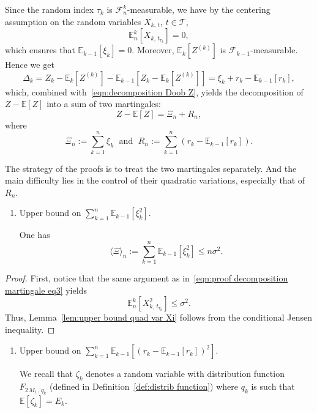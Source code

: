 \documentclass[AHL,Unicode,longabstracts,published]{cedram}
\newcommand{\bE}{\mathbb{E}}
\newcommand{\cF}{\mathcal{F}}
\newcommand{\cT}{\mathcal{T}}
\newcommand*{\romanenumi}{\renewcommand*{\theenumi}{\roman{enumi}}}
\begin{document}
Since the random index $\tau_k$ is $\cF_n^k$-measurable, we have by the centering assumption on the random variables $X_{k,\,t}$, $t\in\cT$,
\begin{equation}\label{eqn:proof decomposition martingale eq3}
\bE_n^k\left[X_{k,\,t_{\tau_k}}\right] =0,
\end{equation}
which ensures that $\bE_{k-1}[\xi_k]=0$. Moreover, $\bE_k[Z^{(k)}]$ is $\cF_{k-1}$-measurable. Hence we get
\[
\Delta_k =Z_k-\bE_k\left[Z^{(k)}\right]-\bE_{k-1}\left[Z_k-\bE_k\left[Z^{(k)}\right]\right]= \xi_k + r_k -\bE_{k-1}[r_k],
\]
which, combined with~\eqref{eqn:decomposition Doob Z}, yields the decomposition of $Z-\bE[Z]$ into a sum of two martingales:
\begin{equation}\label{eqn:decomposition Z-EZ}
Z-\bE[Z]=\Xi_n +R_n,
\end{equation}
where
\begin{equation}\label{eqn:decomposition Z-EZ-def martingales}
\Xi_n:=\sum_{k=1}^n \xi_k \; \text{ and }\;R_n:= \sum_{k=1}^n \left(r_k-\bE_{k-1}[r_k]\right).
\end{equation}


The strategy of the proofs is to treat the two martingales separately. And the main difficulty lies in the control of their quadratic variations, especially that of $R_n$.
\begin{enumerate}\romanenumi
\item Upper bound on $\sum_{k=1}^n \bE_{k-1}[\xi_k^2]$.
\begin{lemm}\label{lem:upper bound quad var Xi}
One has
\[
\langle \Xi \rangle_n:=\sum_{k=1}^n \bE_{k-1}\left[\xi_k^2\right]\leq n\sigma^2.
\]
\end{lemm}
\end{enumerate}

\begin{proof}
First, notice that the same argument as in~\eqref{eqn:proof decomposition martingale eq3} yields
\[
\bE_n^k[X_{k,\,t_{\tau_k}}^2]\leq \sigma^2.
\]
Thus, Lemma~\ref{lem:upper bound quad var Xi} follows from the conditional Jensen inequality.
\end{proof}
\begin{enumerate}\romanenumi
\setcounter{enumi}{1}
\item Upper bound on $ \sum_{k=1}^n\bE_{k-1}[(r_k-\bE_{k-1}[r_k])^2]$.

We recall that $\zeta_k$ denotes a random variable with distribution function $F_{2\,M_1,\,q_k}$ (defined in Definition~\ref{def:distrib function}) where $q_k$ is such that $\bE[\zeta_k]=E_k$.
\end{enumerate}
\end{document}
